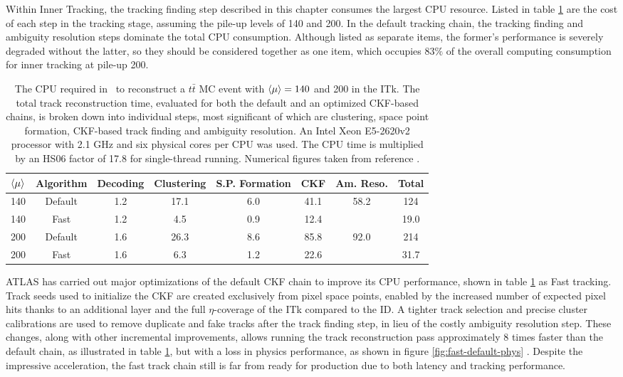 Within Inner Tracking, the tracking finding step described in this chapter consumes the largest CPU resource. 
Listed in table \ref{tab:tracking-time-breakdown} are the cost of each step in the tracking stage, assuming the pile-up levels of 140 and 200. 
In the default tracking chain, the tracking finding and ambiguity resolution steps dominate the total CPU consumption. 
Although listed as separate items, the former's performance is severely degraded without the latter, so they should be considered together as one item, which occupies $83\%$ of the overall computing consumption for inner tracking at pile-up 200.

\begin{table}[h!]
    \centering
    \begin{tabular}{|c|c||c|c|c|c|c||c|}
    \hline
       $\expval{\mu}$  & Algorithm & Decoding & Clustering & S.P. Formation & CKF & Am. Reso. &  Total \\
       \hline \hline
        140 & Default & 1.2 & 17.1 & 6.0 & 41.1 & 58.2 & 124 \\ \hline
        140 & Fast & 1.2 & 4.5 & 0.9 & 12.4 &  & 19.0 \\ \hline \hline

        200 & Default & 1.6 & 26.3 & 8.6 & 85.8 & 92.0 & 214 \\ \hline
        200 & Fast & 1.6 & 6.3 & 1.2 & 22.6 & & 31.7 \\ \hline
    \end{tabular}
    \caption{The CPU required in \hssec~to reconstruct a $t\bar{t}$ MC event with $\expval{\mu}=140$ and 200 in the ITk. The total track reconstruction time, evaluated for both the default and an optimized CKF-based chains, is broken down into individual steps, most significant of which are clustering, space point formation, CKF-based track finding and ambiguity resolution. An Intel Xeon E5-2620v2 processor with 2.1 GHz and six physical cores per CPU was used. The CPU time is multiplied by an HS06 factor of 17.8 for single-thread running. Numerical figures taken from reference \cite{ATL-PHYS-PUB-2019-041}.}
    \label{tab:tracking-time-breakdown}
\end{table}

ATLAS has carried out major optimizations of the default CKF chain to improve its CPU performance, shown in table \ref{tab:tracking-time-breakdown} as Fast tracking. 
Track seeds used to initialize the CKF are created exclusively from pixel space points, enabled by the increased number of expected pixel hits thanks to an additional layer and the full $\eta$-coverage of the ITk compared to the ID. 
A tighter track selection and precise cluster calibrations are used to remove duplicate and fake tracks after the track finding step, in lieu of the costly ambiguity resolution step. 
These changes, along with other incremental improvements, allows running the track reconstruction pass approximately 8 times faster than the default chain, as illustrated in table \ref{tab:tracking-time-breakdown}, but with a loss in physics performance, as shown in figure \ref{fig:fast-default-phys} \cite{ATL-PHYS-PUB-2019-041}.
Despite the impressive acceleration, the fast track chain still is far from ready for production due to both latency and tracking performance.

